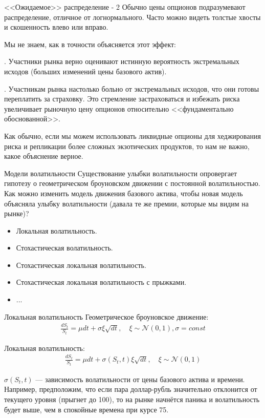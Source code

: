 \documentclass{beamer}
\begin{document}
\begin{frame}{<<Ожидаемое>> распределение - 2}
\justify
Обычно цены опционов подразумевают распределение, отличное от логнормального. Часто можно видеть толстые хвосты и скошенность влево или вправо.

\justify
Мы не знаем, как в точности объясняется этот эффект:

. Участники рынка верно оценивают истинную вероятность экстремальных исходов (больших изменений цены базового актив).

. Участникам рынка настолько больно от экстремальных исходов, что они готовы переплатить за страховку. Это стремление застраховаться и избежать риска увеличивает рыночную цену опционов относительно <<фундаментально обоснованной>>.

\justify
Как обычно, если мы можем использовать ликвидные опционы для хеджирования риска и репликации более сложных экзотических продуктов, то нам не важно, какое объяснение верное.
\end{frame}



\begin{frame}{Модели волатильности}
\justify
Существование улыбки волатильности опровергает гипотезу о геометрическом броуновском движении с постоянной волатильностью. Как можно изменить модель движения базового актива, чтобы новая модель объясняла улыбку волатильности (давала те же премии, которые мы видим на рынке)?

\justify
\begin{itemize}
\item Локальная волатильность.
\item Стохастическая волатильность.
\item Стохастическая локальная волатильность.
\item Стохастическая локальная волатильность с прыжками.
\item ...
\end{itemize}
\end{frame}



\begin{frame}{Локальная волатильность}
\justify
Геометрическое броуновское движение:
\begin{align*}
\frac{dS_t}{S_t} = \mu dt + \sigma\xi\sqrt{dt}, \quad \xi \sim \mathcal{N}(0, 1), \sigma = const
\end{align*}

\justify
Локальная волатильность:
\begin{align*}
\frac{dS_t}{S_t} = \mu dt + \sigma(S_t, t)\xi\sqrt{dt}, \quad \xi \sim \mathcal{N}(0, 1)
\end{align*}

\justify
$\sigma(S_t, t)$ --- зависимость волатильности от цены базового актива и времени. Например, предположим, что если пара доллар-рубль значительно отклонится от текущего уровня (прыгнет до 100), то на рынке начнётся паника и волатильность будет выше, чем в спокойные времена при курсе 75.
\end{frame}
\end{document}
